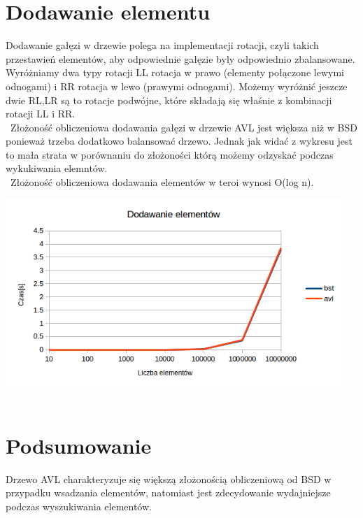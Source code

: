 \documentclass[11pt]{article}
\begin{document}
\section{Dodawanie elementu}
Dodawanie gałęzi w drzewie polega na implementacji rotacji, czyli takich przestawień elementów, aby odpowiednie gałęzie byly odpowiednio zbalansowane. Wyróżniamy dwa typy rotacji LL rotacja w prawo (elementy połączone lewymi odnogami) i RR rotacja w lewo (prawymi odnogami). Możemy wyróżnić jeszcze dwie RL,LR są to rotacje podwójne, które składają się właśnie z kombinacji rotacji LL i RR.  \\\
Złożoność obliczeniowa dodawania gałęzi w drzewie AVL jest większa niż w BSD ponieważ trzeba dodatkowo balansować drzewo. Jednak jak widać z wykresu jest to mała strata w porównaniu do złożoności którą możemy odzyskać podczas  wykukiwania elemntów.\\\
Złożoność obliczeniowa dodawania elementów w teroi wynosi O(log n).

\includegraphics[width=5in]{dod.png}\\\




\section{Podsumowanie}
Drzewo AVL charakteryzuje się większą złożonością obliczeniową od BSD w przypadku wsadzania elementów, natomiast jest zdecydowanie wydajniejsze podczas wyszukiwania elementów.
\end{document}
